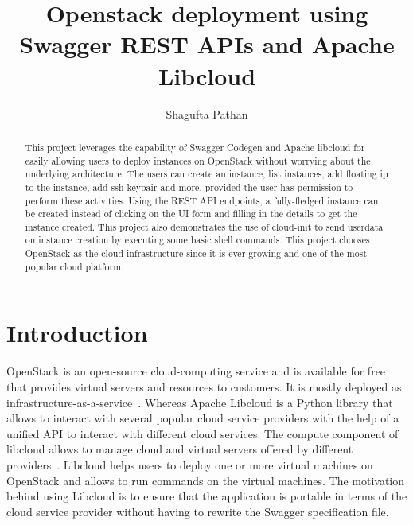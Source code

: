 
\title{Openstack deployment using Swagger REST APIs and Apache Libcloud}

\author{Shagufta Pathan}

\renewcommand{\shortauthors}{Shagufta}

\begin{abstract}
This project leverages the capability of Swagger Codegen and Apache libcloud 
for easily allowing users to deploy instances on OpenStack without worrying 
about the underlying architecture. The users can create an instance, list 
instances, add floating ip to the instance, add ssh keypair and more, provided 
the user has permission to perform these activities. Using the REST API 
endpoints, a fully-fledged instance can be created instead of clicking on the 
UI form and filling in the details to get the instance created. This project 
also demonstrates the use of cloud-init to send userdata on instance creation 
by executing some basic shell commands. This project chooses OpenStack as the 
cloud infrastructure since it is ever-growing and one of the most popular 
cloud platform.
\end{abstract}


\maketitle

\section{Introduction}
OpenStack is an open-source cloud-computing service and is available for free
that provides virtual servers and resources to customers. It is mostly 
deployed as infrastructure-as-a-service~\cite{hid-sp18-516-www-openstack}. 
Whereas Apache Libcloud is a Python library that allows to interact with 
several popular cloud service providers with the help of a unified API to 
interact with different cloud services. The compute component of libcloud 
allows to manage cloud and virtual servers offered by different 
providers~\cite{hid-sp18-516-www-libcloud}. Libcloud helps users to deploy one 
or more virtual machines on OpenStack and allows to run commands on the 
virtual machines. The motivation behind using Libcloud is to ensure that the 
application is portable in terms of the cloud service provider without having 
to rewrite the Swagger specification file.

